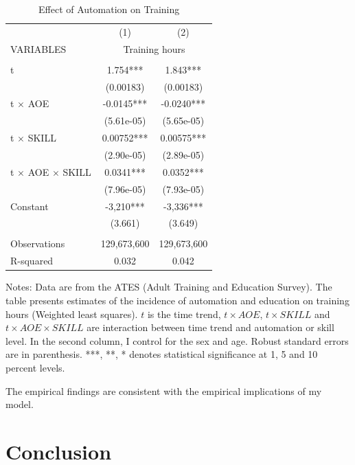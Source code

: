 \documentclass[12pt]{article}
\begin{document}
\begin{table}[h!]
\begin{center}
\scriptsize
\begin{tabular}{lcc} \hline \hline
 & (1) & (2) \\
VARIABLES & \multicolumn{2}{c}{Training hours} \\ \hline
 &  &  \\
t  & 1.754*** & 1.843*** \\
 & (0.00183) & (0.00183) \\
t $\times$ AOE & -0.0145*** & -0.0240*** \\
 & (5.61e-05) & (5.65e-05) \\
t $\times$ SKILL & 0.00752*** & 0.00575*** \\
 & (2.90e-05) & (2.89e-05) \\
t $\times$ AOE $\times$ SKILL & 0.0341*** & 0.0352*** \\
 & (7.96e-05) & (7.93e-05) \\
Constant & -3,210*** & -3,336*** \\
 & (3.661) & (3.649) \\
 &  &  \\
Observations & 129,673,600 & 129,673,600 \\
 R-squared & 0.032 & 0.042 \\ \hline
\end{tabular}
\end{center}
\caption{Effect of Automation on Training}
\label{estimation4}
{\scriptsize Notes: Data are from the ATES (Adult Training and Education Survey). The table presents estimates of the incidence of automation and education on training hours (Weighted least squares). $t$ is the time trend, $t\times AOE$, $t\times SKILL$ and $t\times AOE\times SKILL$ are interaction between time trend and automation or skill level. In the second column, I control for the sex and age. Robust standard errors are in parenthesis. ***, **, * denotes statistical significance at 1, 5 and 10 percent levels.}
\end{table}

The empirical findings are consistent with the empirical implications of my model. 

\section{Conclusion}
\end{document}
